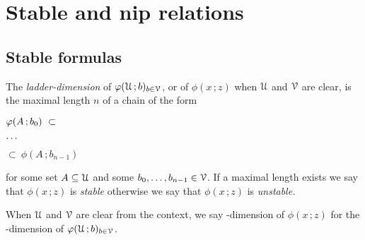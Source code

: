 \documentclass[scombinatorics.tex]{subfiles}
\begin{document}
\chapter{Stable and {\sc nip} relations}
\label{sauer}



\def\medrel#1{\parbox[t]{5ex}{$\displaystyle\hfil #1$}}
\def\ceq#1#2#3{\parbox[t]{20ex}{$\displaystyle #1$}\medrel{#2}{$\displaystyle #3$}}


\section{Stable formulas}\label{VCdim}

The \emph{ladder-dimension\/} of $\varphi(\EuScript U\,;b)_{b\in\EuScript V}$, or of $\phi(x\,;z)$ when $\EuScript U$ and $\EuScript V$ are clear, is the maximal length $n$ of a chain of the form

\ceq{\hfill\phi(A\,;b_0)\ \subset}{\dots}{\subset\ \phi(A\,;b_{n-1})}
 
for some set $A\subseteq\EuScript U$ and some $b_0,\dots,b_{n-1}\in\EuScript V$. If a maximal length exists we say that  $\phi(x\,;z)$ is \emph{stable\/} otherwise we say that $\phi(x\,;z)$ is \emph{unstable.}

When $\EuScript U$ and $\EuScript V$ are clear from the context, we say \vc-dimension of $\phi(x\,;z)$ for the \vc-dimension of $\varphi(\EuScript U\,;b)_{b\in\EuScript V}$.


  
  
 
  
  
  
\end{document}
